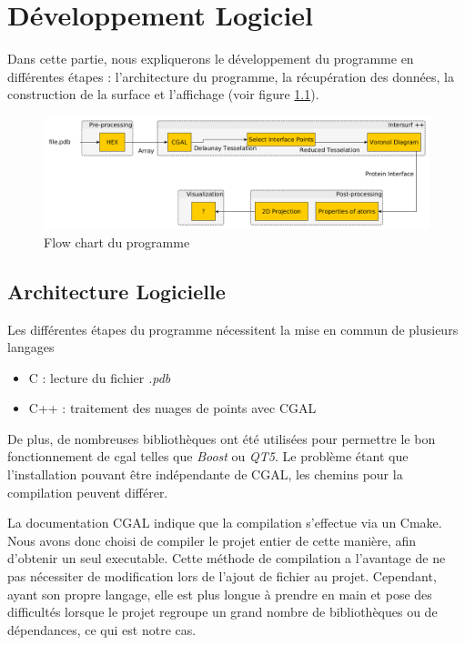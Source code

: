 \chapter{Développement Logiciel}

Dans cette partie, nous expliquerons le développement du programme en différentes étapes :
l'architecture du programme, la récupération des données, la construction de la surface
et l'affichage (voir figure \ref{fig::flow_chart}).

\begin{figure}[ht]
\centering
  \includegraphics[width=\textwidth]{figures/flow_chart.png}
  \caption{Flow chart du programme}
  \label{fig::flow_chart}
\end{figure}

\section{Architecture Logicielle}

Les différentes étapes du programme nécessitent la mise en commun de plusieurs langages
\begin{itemize}
  \item C : lecture du fichier \textit{.pdb}
  \item C++ : traitement des nuages de points avec CGAL
\end{itemize}
De plus, de nombreuses bibliothèques ont été utilisées pour permettre le bon fonctionnement
de \gls{cgal} telles que \textit{Boost} ou \textit{QT5}. Le problème étant que l'installation pouvant
être indépendante de CGAL, les chemins pour la compilation peuvent différer.

La documentation CGAL indique que la compilation s'effectue via un Cmake. Nous avons donc choisi
de compiler le projet entier de cette manière, afin d'obtenir un seul executable.
Cette méthode de compilation a l'avantage de ne pas nécessiter de modification lors de l'ajout
de fichier au projet. Cependant, ayant son propre langage, elle est plus longue à prendre en
main et pose des difficultés lorsque le projet regroupe un grand nombre de bibliothèques
ou de dépendances, ce qui est notre cas.


